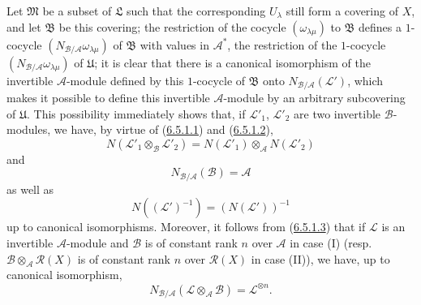 \begin{env}[6.5.2]
Let $\mathfrak{M}$ be a subset of $\mathfrak{L}$ such that the corresponding
$U_\lambda$ still form a covering of $X$, and let $\mathfrak{B}$ be this
covering; the restriction of the cocycle $(\omega_{\lambda\mu})$ to
$\mathfrak{B}$ defines a $1$-cocycle
$(N_{\mathcal{B}/\mathcal{A}}\omega_{\lambda\mu})$ of $\mathfrak{B}$ with
values in $\mathcal{A}^*$, the restriction of the $1$-cocycle
$(N_{\mathcal{B}/\mathcal{A}}\omega_{\lambda\mu})$ of $\mathfrak{U}$; it is
clear that there is a canonical isomorphism of the invertible
$\mathcal{A}$-module defined by this $1$-cocycle of $\mathfrak{B}$ onto
$N_{\mathcal{B}/\mathcal{A}}(\mathcal{L}')$, which makes it possible to
define this invertible $\mathcal{A}$-module by an arbitrary subcovering of
$\mathfrak{U}$. This possibility immediately shows that, if
$\mathcal{L}'_1$, $\mathcal{L}'_2$ are two invertible $\mathcal{B}$-modules,
we have, by virtue of (\hyperref[II.6.5.1.1]{6.5.1.1}) and
(\hyperref[II.6.5.1.2]{6.5.1.2}),
\[
\label{II.6.5.2.1}
N(\mathcal{L}'_1\otimes_{\mathcal{B}}\mathcal{L}'_2)
=N(\mathcal{L}'_1)\otimes_{\mathcal{A}}N(\mathcal{L}'_2)
\tag{6.5.2.1}
\]
and
\[
\label{II.6.5.2.2}
N_{\mathcal{B}/\mathcal{A}}(\mathcal{B})=\mathcal{A}
\tag{6.5.2.2}
\]
as well as
\[
\label{II.6.5.2.3}
N((\mathcal{L}')^{-1})=(N(\mathcal{L}'))^{-1}
\tag{6.5.2.3}
\]
up to canonical isomorphisms. Moreover, it follows from
(\hyperref[II.6.5.1.3]{6.5.1.3}) that if $\mathcal{L}$ is an invertible
$\mathcal{A}$-module and $\mathcal{B}$ is of constant rank $n$ over
$\mathcal{A}$ in case (I) (resp.
$\mathcal{B}\otimes_{\mathcal{A}}\mathcal{R}(X)$ is of constant rank $n$
over $\mathcal{R}(X)$ in case (II)), we have, up to canonical isomorphism,
\[
\label{II.6.5.2.4}
N_{\mathcal{B}/\mathcal{A}}(\mathcal{L}\otimes_{\mathcal{A}}\mathcal{B})
=\mathcal{L}^{\otimes n}.
\tag{6.5.2.4}
\]
\end{env}

